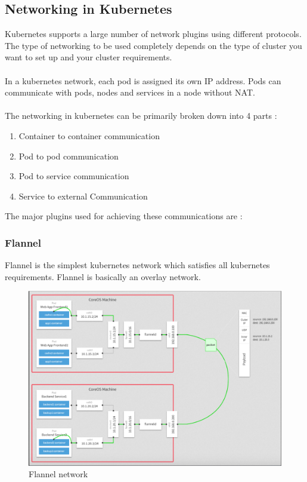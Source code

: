 \documentclass[12pt]{article}
\begin{document}
\subsection{Networking in Kubernetes}
Kubernetes supports a large number of network plugins using different protocols. The type of networking to be used completely depends on the type of cluster you want to set up and your cluster requirements.\\\\
In a kubernetes network, each pod is assigned its own IP address. Pods can communicate with pods, nodes and services in a node without NAT. \\\\
The networking in kubernetes can be primarily broken down into 4 parts :
\begin{enumerate}
	\item Container to container communication
	\item Pod to pod communication
	\item Pod to service communication
	\item Service to external Communication
\end{enumerate}
The major plugins used for achieving these communications are :
\subsubsection{Flannel}
Flannel is the simplest kubernetes network  which satisfies all kubernetes requirements. Flannel is basically an overlay network.
\begin{figure}[h!]
	\begin{center}
		\includegraphics[totalheight=0.4\textheight, width=\textwidth]{flannel}
		\caption{Flannel network}
	\end{center}
\end{figure}
\end{document}
